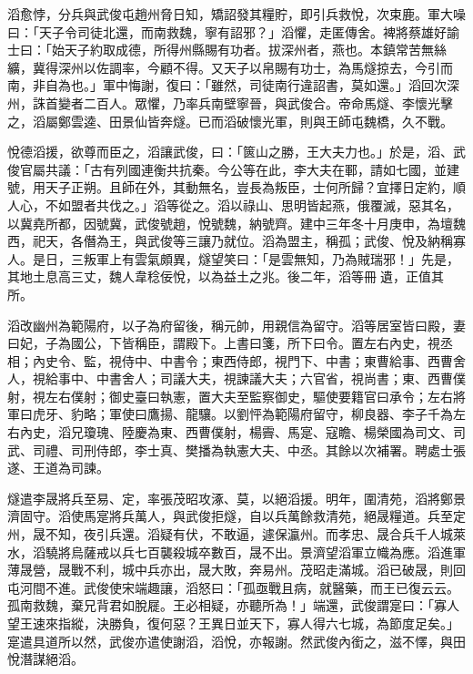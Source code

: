 \begin{pinyinscope}
 滔愈悖，分兵與武俊屯趙州脅日知，矯詔發其糧貯，即引兵救悅，次束鹿。軍大噪曰：「天子令司徒北還，而南救魏，寧有詔邪？」滔懼，走匿傳舍。裨將蔡雄好諭士曰：「始天子約取成德，所得州縣賜有功者。拔深州者，燕也。本鎮常苦無絲纊，冀得深州以佐調率，今顧不得。又天子以帛賜有功士，為馬燧掠去，今引而南，非自為也。」軍中悔謝，復曰：「雖然，司徒南行違詔書，莫如還。」滔回次深州，誅首變者二百人。眾懼，乃率兵南壁寧晉，與武俊合。帝命馬燧、李懷光擊之，滔屬鄭雲逵、田景仙皆奔燧。已而滔破懷光軍，則與王師屯魏橋，久不戰。



 悅德滔援，欲尊而臣之，滔讓武俊，曰：「篋山之勝，王大夫力也。」於是，滔、武俊官屬共議：「古有列國連衡共抗秦。今公等在此，李大夫在鄆，請如七國，並建號，用天子正朔。且師在外，其動無名，豈長為叛臣，士何所歸？宜擇日定約，順人心，不如盟者共伐之。」滔等從之。滔以祿山、思明皆起燕，俄覆滅，惡其名，以冀堯所都，因號冀，武俊號趙，悅號魏，納號齊。建中三年冬十月庚申，為壇魏西，祀天，各僭為王，與武俊等三讓乃就位。滔為盟主，稱孤；武俊、悅及納稱寡人。是日，三叛軍上有雲氣頗異，燧望笑曰：「是雲無知，乃為賊瑞邪！」先是，其地土息高三丈，魏人韋稔佞悅，以為益土之兆。後二年，滔等冊遺，正值其所。



 滔改幽州為範陽府，以子為府留後，稱元帥，用親信為留守。滔等居室皆曰殿，妻曰妃，子為國公，下皆稱臣，謂殿下。上書曰箋，所下曰令。置左右內史，視丞相；內史令、監，視侍中、中書令；東西侍郎，視門下、中書；東曹給事、西曹舍人，視給事中、中書舍人；司議大夫，視諫議大夫；六官省，視尚書；東、西曹僕射，視左右僕射；御史臺曰執憲，置大夫至監察御史，驅使要籍官曰承令；左右將軍曰虎牙、豹略；軍使曰鷹揚、龍驤。以劉怦為範陽府留守，柳良器、李子千為左右內史，滔兄瓊瑰、陸慶為東、西曹僕射，楊霽、馬寔、寇瞻、楊榮國為司文、司武、司禮、司刑侍郎，李士真、樊播為執憲大夫、中丞。其餘以次補署。聘處士張遂、王道為司諫。



 燧遣李晟將兵至易、定，率張茂昭攻涿、莫，以絕滔援。明年，圍清苑，滔將鄭景濟固守。滔使馬寔將兵萬人，與武俊拒燧，自以兵萬餘救清苑，絕晟糧道。兵至定州，晟不知，夜引兵還。滔疑有伏，不敢逼，遽保瀛州。而孝忠、晟合兵千人城萊水，滔驍將烏薩戒以兵七百襲殺城卒數百，晟不出。景濟望滔軍立幟為應。滔進軍薄晟營，晟戰不利，城中兵亦出，晟大敗，奔易州。茂昭走滿城。滔已破晟，則回屯河間不進。武俊使宋端趣讓，滔怒曰：「孤亟戰且病，就醫藥，而王已復云云。孤南救魏，棄兄背君如脫屣。王必相疑，亦聽所為！」端還，武俊謂寔曰：「寡人望王速來指縱，決勝負，復何惡？王異日並天下，寡人得六七城，為節度足矣。」寔遣具道所以然，武俊亦遣使謝滔，滔悅，亦報謝。然武俊內銜之，滋不懌，與田悅潛謀絕滔。




\end{pinyinscope}
